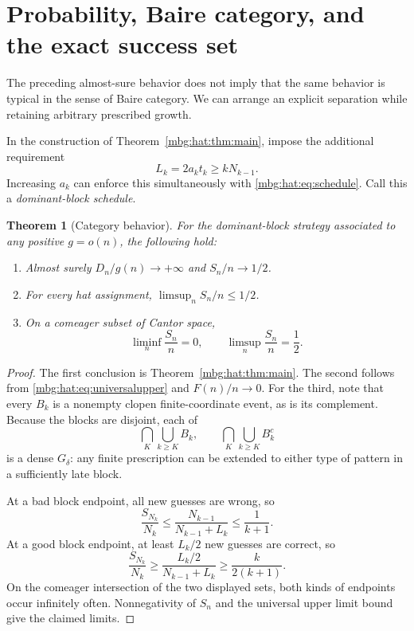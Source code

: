 \documentclass[11pt,letterpaper]{article}
\newtheorem{theorem}{Theorem}[section]
\theoremstyle{definition}
\begin{document}
\section{Probability, Baire category, and the exact success set}
\label{mbg:hat:sec:category}

The preceding almost-sure behavior does not imply that the same
behavior is typical in the sense of Baire category. We can arrange
an explicit separation while retaining arbitrary prescribed growth.

In the construction of Theorem~\ref{mbg:hat:thm:main}, impose the additional
requirement
\[
  L_k=2a_kt_k\ge kN_{k-1}.                               \tag{26.1}\label{mbg:hat:eq:dominance}
\]
Increasing \(a_k\) can enforce this simultaneously with
\eqref{mbg:hat:eq:schedule}. Call this a \emph{dominant-block schedule}.

\begin{theorem}[Category behavior]\label{mbg:hat:thm:category}
For the dominant-block strategy associated to any positive \(g=o(n)\),
the following hold:
\begin{enumerate}
\item Almost surely \(D_n/g(n)\to+\infty\) and \(S_n/n\to1/2\).
\item For every hat assignment, \(\limsup_n S_n/n\le1/2\).
\item On a comeager subset of Cantor space,
\[
  \liminf_n\frac{S_n}{n}=0,\qquad
  \limsup_n\frac{S_n}{n}=\frac12.
\]
\end{enumerate}
\end{theorem}
\begin{proof}
The first conclusion is Theorem~\ref{mbg:hat:thm:main}.
The second follows from \eqref{mbg:hat:eq:universalupper} and \(F(n)/n\to0\).
For the third, note that every \(B_k\) is a nonempty clopen
finite-coordinate event, as is its complement. Because the blocks
are disjoint, each of
\[
  \bigcap_K\bigcup_{k\ge K}B_k,
  \qquad
  \bigcap_K\bigcup_{k\ge K}B_k^c
\]
is a dense \(G_\delta\): any finite prescription can be extended
to either type of pattern in a sufficiently late block.

At a bad block endpoint, all new guesses are wrong, so
\[
  \frac{S_{N_k}}{N_k}
  \le\frac{N_{k-1}}{N_{k-1}+L_k}\le\frac1{k+1}.
\]
At a good block endpoint, at least \(L_k/2\) new guesses are
correct, so
\[
  \frac{S_{N_k}}{N_k}
  \ge\frac{L_k/2}{N_{k-1}+L_k}\ge\frac{k}{2(k+1)}.
\]
On the comeager intersection of the two displayed sets, both kinds
of endpoints occur infinitely often. Nonnegativity of \(S_n\)
and the universal upper limit bound give the claimed limits.
\end{proof}
\end{document}
